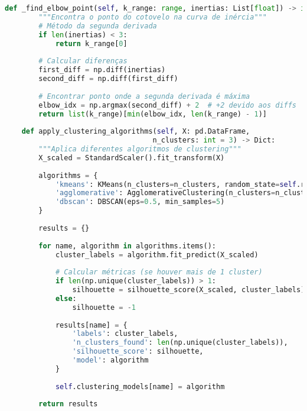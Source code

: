 \begin{pythonbox}
\begin{lstlisting}[language=Python]  
    def _find_elbow_point(self, k_range: range, inertias: List[float]) -> int:
        """Encontra o ponto do cotovelo na curva de inércia"""
        # Método da segunda derivada
        if len(inertias) < 3:
            return k_range[0]
            
        # Calcular diferenças
        first_diff = np.diff(inertias)
        second_diff = np.diff(first_diff)
        
        # Encontrar ponto onde a segunda derivada é máxima
        elbow_idx = np.argmax(second_diff) + 2  # +2 devido aos diffs
        return list(k_range)[min(elbow_idx, len(k_range) - 1)]
    
    def apply_clustering_algorithms(self, X: pd.DataFrame, 
                                   n_clusters: int = 3) -> Dict:
        """Aplica diferentes algoritmos de clustering"""
        X_scaled = StandardScaler().fit_transform(X)
        
        algorithms = {
            'kmeans': KMeans(n_clusters=n_clusters, random_state=self.random_state),
            'agglomerative': AgglomerativeClustering(n_clusters=n_clusters),
            'dbscan': DBSCAN(eps=0.5, min_samples=5)
        }
        
        results = {}
        
        for name, algorithm in algorithms.items():
            cluster_labels = algorithm.fit_predict(X_scaled)
            
            # Calcular métricas (se houver mais de 1 cluster)
            if len(np.unique(cluster_labels)) > 1:
                silhouette = silhouette_score(X_scaled, cluster_labels)
            else:
                silhouette = -1
            
            results[name] = {
                'labels': cluster_labels,
                'n_clusters_found': len(np.unique(cluster_labels)),
                'silhouette_score': silhouette,
                'model': algorithm
            }
            
            self.clustering_models[name] = algorithm
        
        return results
\end{lstlisting}
\end{pythonbox}

\newpage

